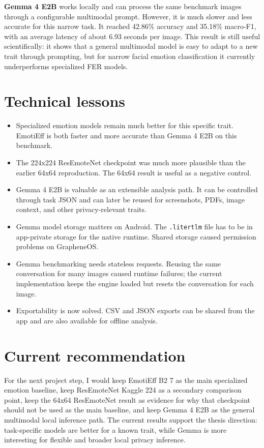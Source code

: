 \documentclass[11pt,a4paper]{article}
\begin{document}
\textbf{Gemma 4 E2B} works locally and can process the same benchmark images through a configurable multimodal prompt. However, it is much slower and less accurate for this narrow task. It reached 42.86\% accuracy and 35.18\% macro-F1, with an average latency of about 6.93 seconds per image. This result is still useful scientifically: it shows that a general multimodal model is easy to adapt to a new trait through prompting, but for narrow facial emotion classification it currently underperforms specialized FER models.

\section*{Technical lessons}
\begin{itemize}[leftmargin=*]
  \item Specialized emotion models remain much better for this specific trait. EmotiEff is both faster and more accurate than Gemma 4 E2B on this benchmark.
  \item The 224x224 ResEmoteNet checkpoint was much more plausible than the earlier 64x64 reproduction. The 64x64 result is useful as a negative control.
  \item Gemma 4 E2B is valuable as an extensible analysis path. It can be controlled through task JSON and can later be reused for screenshots, PDFs, image context, and other privacy-relevant traits.
  \item Gemma model storage matters on Android. The \texttt{.litertlm} file has to be in app-private storage for the native runtime. Shared storage caused permission problems on GrapheneOS.
  \item Gemma benchmarking needs stateless requests. Reusing the same conversation for many images caused runtime failures; the current implementation keeps the engine loaded but resets the conversation for each image.
  \item Exportability is now solved. CSV and JSON exports can be shared from the app and are also available for offline analysis.
\end{itemize}

\section*{Current recommendation}
For the next project step, I would keep EmotiEff B2 7 as the main specialized emotion baseline, keep ResEmoteNet Kaggle 224 as a secondary comparison point, keep the 64x64 ResEmoteNet result as evidence for why that checkpoint should not be used as the main baseline, and keep Gemma 4 E2B as the general multimodal local inference path. The current results support the thesis direction: task-specific models are better for a known trait, while Gemma is more interesting for flexible and broader local privacy inference.
\end{document}

